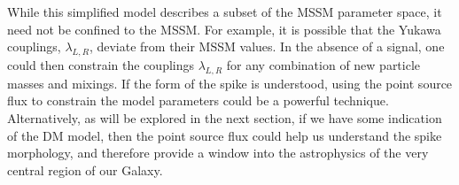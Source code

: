 \documentclass[11pt]{article}
\begin{document}



While this simplified model describes a subset of the MSSM parameter space, it need not be confined to the MSSM.  For example, it is possible that the Yukawa couplings, $\lambda_{L,R}$, deviate from their MSSM values.  In the absence of a signal, one could then constrain the couplings $\lambda_{L,R}$ for any combination of new particle masses and mixings.  If the form of the spike is understood, using the point source flux to constrain the model parameters could be a powerful technique.  Alternatively, as will be explored in the next section, if we have some indication of the DM model, then the point source flux could help us understand the spike morphology, and therefore provide a window into the astrophysics of the very central region of our Galaxy.




\end{document}
